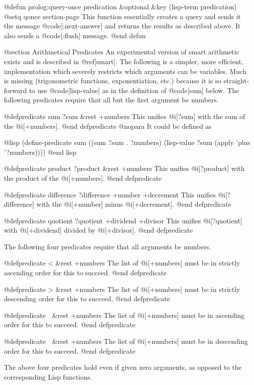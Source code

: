 {@defun prolog:query-once predication &optional &key (lisp-term predication)
@setq qonce section-page
This function essentially creates a query and sends it the message
@code[:next-answer] and returns the results as described above.
It also sends a @code[:flush] message.
@end defun

@section Arithmetical Predicates
An experimental version of smart arithmetic exists and is described in
@ref[smart].
The following is a simpler, more efficient, implementation which 
severely restricts which arguments can be variables.
Much is missing (trigonometric functions, exponentiation, etc.) 
because it is so
straight-forward to use @code[lisp-value] as in the definition of @code[sum]
below. 
The following predicates require that all but the first argument be numbers.

@defpredicate sum ?sum &rest +numbers
This unifies @i[?sum] with the sum of the @i[+numbers].
@end defpredicate
@nopara
It could be defined as

@lisp
(define-predicate sum
  ((sum ?sum . ?numbers)
   (lisp-value ?sum (apply 'plus '?numbers))))
@end lisp

@defpredicate product ?product &rest +numbers
This unifies @i[?product] with the product of the @i[+numbers].
@end defpredicate


@defpredicate difference ?difference +number +decrement
This unifies @i[?difference] with the @i[+number] minus @i[+decrement].
@end defpredicate

@defpredicate quotient ?quotient +dividend +divisor
This unifies @i[?quotient] with @i[+dividend] divided by @i[+divisor].
@end defpredicate


The following four predicates require that all arguments be numbers.

@defpredicate < &rest +numbers
The list of @i[+numbers] must be in strictly 
ascending order for this to succeed.
@end defpredicate


@defpredicate > &rest +numbers
The list of @i[+numbers] must be in strictly 
descending order for this to succeed.
@end defpredicate

@defpredicate  &rest +numbers
The list of @i[+numbers] must be in ascending order for this to succeed.
@end defpredicate

@defpredicate  &rest +numbers
The list of @i[+numbers] must be in descending order for this to succeed.
@end defpredicate

The above four predicates hold even if given zero arguments, as
opposed to the corresponding Lisp functions.

}
